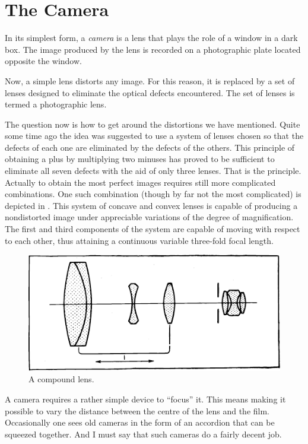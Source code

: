 \section{The Camera}
In its simplest form, a \emph{camera} is a lens that plays the role of a window in a dark box. The image produced by the lens is recorded on a photographic plate located opposite the window.

Now, a simple lens distorts any image. For this reason, it is replaced by a set of lenses designed to eliminate the optical defects encountered. The set of lenses is termed a photographic lens.

The question now is how to get around the distortions we have mentioned. Quite some time ago the idea was suggested to use a system of lenses chosen so that the defects of each one are eliminated by the defects of the others. This principle of obtaining a plus by multiplying two minuses has proved to be sufficient to eliminate all seven defects with the aid of only three lenses. That is the principle. Actually to obtain the most perfect images requires still more complicated combinations. One such combination (though by far not the most complicated) is depicted in .
This system of concave and convex lenses is capable of producing a nondistorted image under appreciable variations of the degree of magnification. The first and third components of the system are capable of moving with respect to each other, thus attaining a continuous variable three-fold focal length. 
\begin{figure}[!ht]
\centering
\includegraphics[width=\textwidth]{figures/fig-02-03.pdf}
\caption{A compound lens.}
\label{fig-2.3}
\end{figure}


A camera requires a rather simple device to ``focus'' it. This means making it possible to vary the distance between the centre of the lens and the film. Occasionally one sees old cameras in the form of an accordion that can be squeezed together. And I must say that such came­ras do a fairly decent job.

